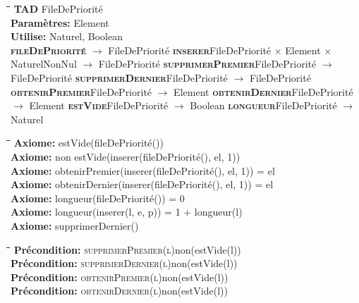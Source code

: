 \documentclass{article}
\newenvironment{tad}{\begin{tabbing}\hspace*{2cm}\=\hspace*{2.5cm}\=\hspace*{3.5cm}\=\hspace*{3cm}\=\kill}{\end{tabbing}}
\newcommand{\tadNom}[1]{\textbf{TAD} #1\\}
\newcommand{\tadParametres}[1]{\textbf{Paramètres:} #1\\}
\newcommand{\tadDependances}[1]{\textbf{Utilise:} #1\\}
\newcommand{\tadOperation}[4]{\>\textbf{\textsc{#1}}\>#2\>#3\>#4}
\newcommand{\tadAxiome}[1]{\>\textbf{Axiome:} #1\\}
\newcommand{\tadPrecondition}[2]{\>\textbf{Précondition:} \textsc{#1}\>#2\\}
\begin{document}
\begin{tad}
    \tadNom{FileDePriorité}
    \tadParametres{Element}
    \tadDependances{Naturel, Boolean}

    \tadOperation{fileDePriorité}{}{ $\rightarrow$ }{FileDePriorité}
    \tadOperation{inserer}{FileDePriorité $\times$ Element $\times$ NaturelNonNul}{ $\rightarrow$ }{FileDePriorité}
    \tadOperation{supprimerPremier}{FileDePriorité}{ $\rightarrow$ }{FileDePriorité}
    \tadOperation{supprimerDernier}{FileDePriorité}{ $\rightarrow$ }{FileDePriorité}
    \tadOperation{obtenirPremier}{FileDePriorité}{ $\rightarrow$ }{Element}
    \tadOperation{obtenirDernier}{FileDePriorité}{ $\rightarrow$ }{Element}
    \tadOperation{estVide}{FileDePriorité}{ $\rightarrow$ }{Boolean}
    \tadOperation{longueur}{FileDePriorité}{ $\rightarrow$ }{Naturel}
\end{tad}

\begin{tad}
    \tadAxiome{estVide(fileDePriorité())}
    \tadAxiome{non estVide(inserer(fileDePriorité(), el, 1))}
    \tadAxiome{obtenirPremier(inserer(fileDePriorité(), el, 1)) = el}
    \tadAxiome{obtenirDernier(inserer(fileDePriorité(), el, 1)) = el}
    \tadAxiome{longueur(fileDePriorité()) = 0}
    \tadAxiome{longueur(inserer(l, e, p)) = 1 + longueur(l)}
    \tadAxiome{supprimerDernier()}
\end{tad}

\begin{tad}
    \tadPrecondition{supprimerPremier(l)}{non(estVide(l))}
    \tadPrecondition{supprimerDernier(l)}{non(estVide(l))}
    \tadPrecondition{obtenirPremier(l)}{non(estVide(l))}
    \tadPrecondition{obtenirDernier(l)}{non(estVide(l))}
\end{tad}
\end{document}
